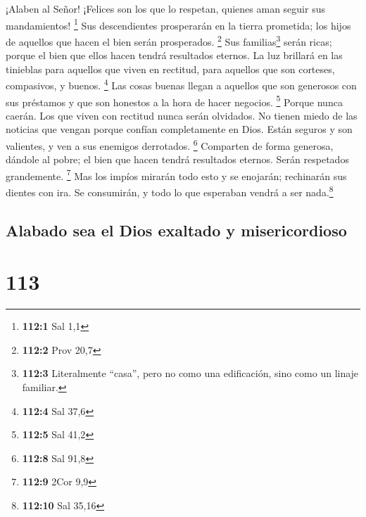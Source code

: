  ¡Alaben al Señor! ¡Felices son los que lo respetan,
quienes aman seguir sus mandamientos! \footnote{\textbf{112:1} Sal 1,1}
 Sus descendientes prosperarán en la tierra prometida; los
hijos de aquellos que hacen el bien serán prosperados. \footnote{\textbf{112:2}
  Prov 20,7}  Sus familias\footnote{\textbf{112:3}
  Literalmente ``casa'', pero no como una edificación, sino como un
  linaje familiar.} serán ricas; porque el bien que ellos hacen tendrá
resultados eternos.  La luz brillará en las tinieblas para
aquellos que viven en rectitud, para aquellos que son corteses,
compasivos, y buenos. \footnote{\textbf{112:4} Sal 37,6} 
Las cosas buenas llegan a aquellos que son generosos con sus préstamos y
que son honestos a la hora de hacer negocios. \footnote{\textbf{112:5}
  Sal 41,2}  Porque nunca caerán. Los que viven con
rectitud nunca serán olvidados.  No tienen miedo de las
noticias que vengan porque confían completamente en Dios. 
Están seguros y son valientes, y ven a sus enemigos derrotados.
\footnote{\textbf{112:8} Sal 91,8}  Comparten de forma
generosa, dándole al pobre; el bien que hacen tendrá resultados eternos.
Serán respetados grandemente. \footnote{\textbf{112:9} 2Cor 9,9}
 Mas los impíos mirarán todo esto y se enojarán;
rechinarán sus dientes con ira. Se consumirán, y todo lo que esperaban
vendrá a ser nada.\footnote{\textbf{112:10} Sal 35,16}

\hypertarget{alabado-sea-el-dios-exaltado-y-misericordioso}{%
\subsection{Alabado sea el Dios exaltado y
misericordioso}\label{alabado-sea-el-dios-exaltado-y-misericordioso}}

\hypertarget{section-112}{%
\section{113}\label{section-112}}

